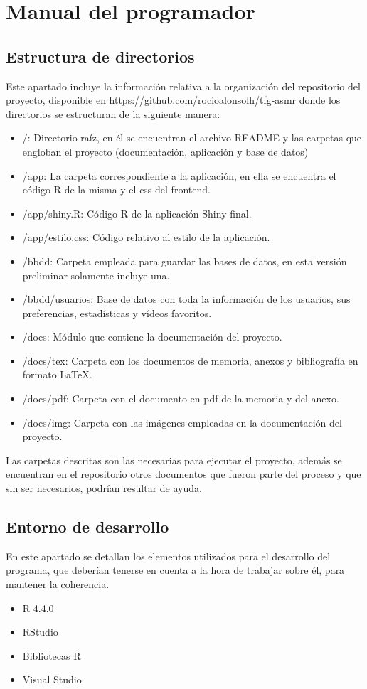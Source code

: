 \documentclass[a4paper,12pt,twoside]{memoir}
\newcommand{\apendice}[1]{
	\chapter{#1}
}
\begin{document}
\apendice{Manual del programador}
\section{Estructura de directorios}
Este apartado incluye la información relativa a la organización del repositorio del proyecto, disponible en \url{https://github.com/rocioalonsolh/tfg-asmr} donde los directorios se estructuran de la siguiente manera:
\begin{itemize}
    \item /: Directorio raíz, en él se encuentran el archivo README y las carpetas que engloban el proyecto (documentación, aplicación y base de datos)
    \item /app: La carpeta correspondiente a la aplicación, en ella se encuentra el código R de la misma y el css del frontend.
    \item /app/shiny.R: Código R de la aplicación Shiny final.
    \item /app/estilo.css: Código relativo al estilo de la aplicación.
    \item /bbdd: Carpeta empleada para guardar las bases de datos, en esta versión preliminar solamente incluye una.
    \item /bbdd/usuarios: Base de datos con toda la información de los usuarios, sus preferencias, estadísticas y vídeos favoritos.
    \item /docs: Módulo que contiene la documentación del proyecto.
    \item /docs/tex: Carpeta con los documentos de memoria, anexos y bibliografía en formato \LaTeX.
    \item /docs/pdf: Carpeta con el documento en pdf de la memoria y del anexo.
    \item /docs/img: Carpeta con las imágenes empleadas en la documentación del proyecto.
\end{itemize}
Las carpetas descritas son las necesarias para ejecutar el proyecto, además se encuentran en el repositorio otros documentos que fueron parte del proceso y que sin ser necesarios, podrían resultar de ayuda.
\section{Entorno de desarrollo}
En este apartado se detallan los elementos utilizados para el desarrollo del programa, que deberían tenerse en cuenta a la hora de trabajar sobre él, para mantener la coherencia.
\begin{itemize}
    \item R 4.4.0
    \item RStudio
    \item Bibliotecas R
    \item Visual Studio
\end{itemize}
\end{document}
